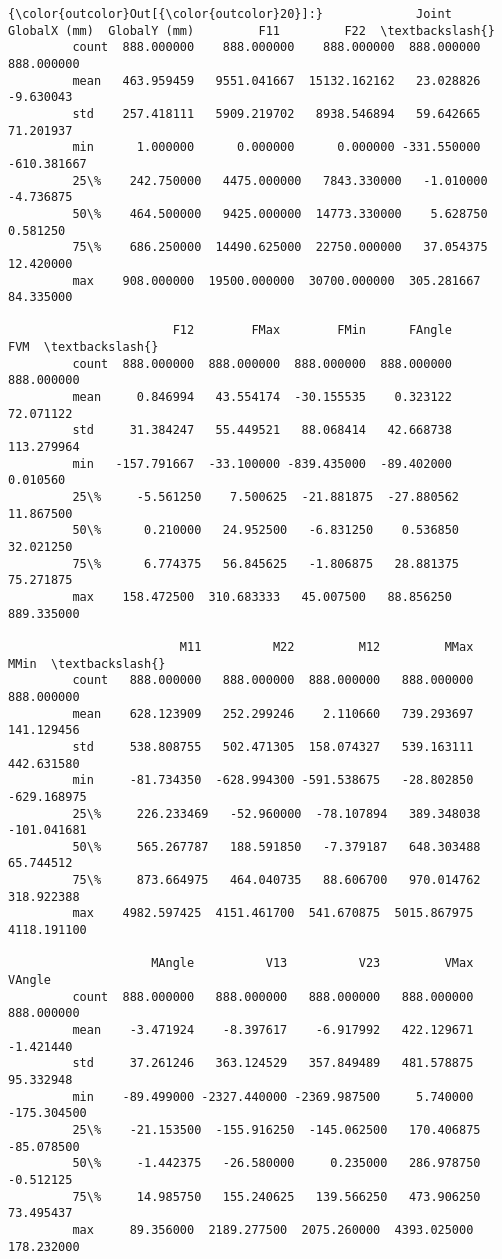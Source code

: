 \documentclass[11pt]{article}
\begin{document}
\begin{Verbatim}[commandchars=\\\{\}]
{\color{outcolor}Out[{\color{outcolor}20}]:}             Joint  GlobalX (mm)  GlobalY (mm)         F11         F22  \textbackslash{}
         count  888.000000    888.000000    888.000000  888.000000  888.000000   
         mean   463.959459   9551.041667  15132.162162   23.028826   -9.630043   
         std    257.418111   5909.219702   8938.546894   59.642665   71.201937   
         min      1.000000      0.000000      0.000000 -331.550000 -610.381667   
         25\%    242.750000   4475.000000   7843.330000   -1.010000   -4.736875   
         50\%    464.500000   9425.000000  14773.330000    5.628750    0.581250   
         75\%    686.250000  14490.625000  22750.000000   37.054375   12.420000   
         max    908.000000  19500.000000  30700.000000  305.281667   84.335000   
         
                       F12        FMax        FMin      FAngle         FVM  \textbackslash{}
         count  888.000000  888.000000  888.000000  888.000000  888.000000   
         mean     0.846994   43.554174  -30.155535    0.323122   72.071122   
         std     31.384247   55.449521   88.068414   42.668738  113.279964   
         min   -157.791667  -33.100000 -839.435000  -89.402000    0.010560   
         25\%     -5.561250    7.500625  -21.881875  -27.880562   11.867500   
         50\%      0.210000   24.952500   -6.831250    0.536850   32.021250   
         75\%      6.774375   56.845625   -1.806875   28.881375   75.271875   
         max    158.472500  310.683333   45.007500   88.856250  889.335000   
         
                        M11          M22         M12         MMax         MMin  \textbackslash{}
         count   888.000000   888.000000  888.000000   888.000000   888.000000   
         mean    628.123909   252.299246    2.110660   739.293697   141.129456   
         std     538.808755   502.471305  158.074327   539.163111   442.631580   
         min     -81.734350  -628.994300 -591.538675   -28.802850  -629.168975   
         25\%     226.233469   -52.960000  -78.107894   389.348038  -101.041681   
         50\%     565.267787   188.591850   -7.379187   648.303488    65.744512   
         75\%     873.664975   464.040735   88.606700   970.014762   318.922388   
         max    4982.597425  4151.461700  541.670875  5015.867975  4118.191100   
         
                    MAngle          V13          V23         VMax      VAngle  
         count  888.000000   888.000000   888.000000   888.000000  888.000000  
         mean    -3.471924    -8.397617    -6.917992   422.129671   -1.421440  
         std     37.261246   363.124529   357.849489   481.578875   95.332948  
         min    -89.499000 -2327.440000 -2369.987500     5.740000 -175.304500  
         25\%    -21.153500  -155.916250  -145.062500   170.406875  -85.078500  
         50\%     -1.442375   -26.580000     0.235000   286.978750   -0.512125  
         75\%     14.985750   155.240625   139.566250   473.906250   73.495437  
         max     89.356000  2189.277500  2075.260000  4393.025000  178.232000  
\end{Verbatim}
            
\end{document}
